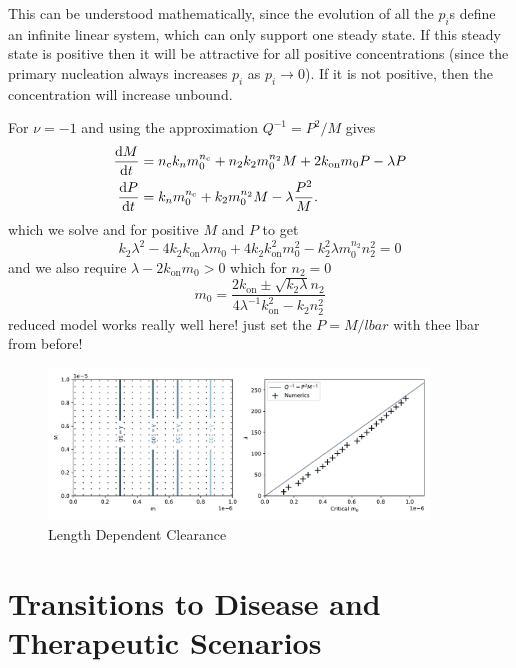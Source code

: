This can be understood mathematically, since the evolution of all the $p_i$s define an infinite linear system, which can only support one steady state. If this steady state is positive then it will be attractive for all positive concentrations (since the primary nucleation always increases  $p_i$ as $p_i \to 0$). If it is not positive, then the concentration will increase unbound.  

For $\nu=-1$ and using the approximation $Q^{-1}=P^2 / M$ gives
\begin{align}
    \frac{\text{d}M}{\text{d}t}&= n_{\mathrm{c}} k_n m_0^{n_{\mathrm{c}}} + n_2 k_2 m_0^{n_2} M + 2 k_\text{on} m_0 P - \lambda P \\
    \frac{\text{d}P}{\text{d}t}&= k_n m_0^{n_{\mathrm{c}}} + k_2 m_0^{n_2} M - \lambda \frac{P^2}{M}.
    \label{eq:4-nudependent}
\end{align}
which we solve and for positive $M$ and $P$ to get
\begin{equation}
k_2 \lambda^2 - 4 k_2 k_\text{on} \lambda m_0 + 4 k_2 k_\text{on}^2 m_0^{2} - k_2^2 \lambda m_0^{n_2} n_2^2 = 0
\end{equation}
and we also require $\lambda - 2 k_\text{on} m_0 > 0$ which for $n_2 = 0$
\begin{equation}
m_0 = \frac{2 k_\text{on} \pm \sqrt{k_2\lambda} n_2}{4 \lambda^{-1} k_\text{on}^2 - k_2 n_2^2}
\end{equation}
reduced model works really well here! just set the $P=M/lbar$ with thee lbar from before!

\begin{figure}
    \centering
    \includegraphics[width=0.9\textwidth]{figures/4-agg-figs/numinus1sidebyside.pdf}
    \caption{Length Dependent Clearance}
    \label{fig:4-numinus1}
\end{figure}

\section{Transitions to Disease and Therapeutic Scenarios}

